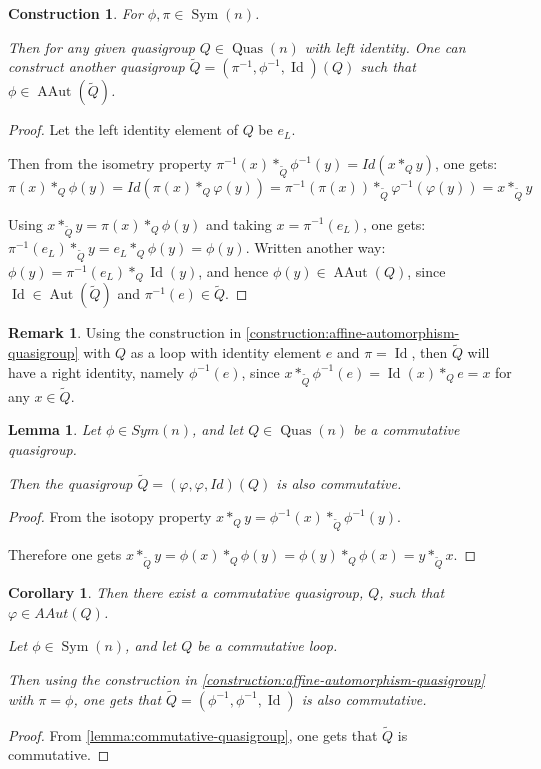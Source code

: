 \documentclass[a4paper, 12pt, english]{article}
\theoremstyle{plain}
\newtheorem{corollary}[theorem]{Corollary}
\newtheorem{lemma}[theorem]{Lemma}
\newtheorem{construction}[theorem]{Construction}
\theoremstyle{definition}
\newtheorem{remark}[theorem]{Remark}
\newcommand{\tuple}[1]{ \left( #1 \right) } %
\DeclareMathOperator{\Aut}{Aut}
\DeclareMathOperator{\AAut}{AAut}
\DeclareMathOperator{\Sym}{Sym}
\DeclareMathOperator{\Quas}{Quas}
\DeclareMathOperator{\Id}{Id}
\begin{document}
\begin{construction} \label{construction:affine-automorphism-quasigroup}
    For \( \phi, \pi \in \Sym(n) \).

    Then for any given quasigroup \( Q \in \Quas(n) \) with left identity. One can construct another quasigroup \( \tilde{Q} = (\pi^{-1}, \phi^{-1}, \Id)(Q) \) such that \( \phi \in \AAut(\tilde{Q}) \).
\end{construction}
\begin{proof}
    Let the left identity element of \( Q \) be \( e_L \).
    
    Then from the isometry property \( \pi^{-1}(x) *_{\tilde{Q}} \phi^{-1}(y) = Id(x *_Q y) \), one gets: 
    \[
        \pi(x) *_Q \phi(y) = Id(\pi(x) *_Q \varphi(y)) = \pi^{-1}(\pi(x)) *_{\tilde{Q}} \varphi^{-1}(\varphi(y)) = x *_{\tilde{Q}} y 
    \]

    Using \( x *_{\tilde{Q}} y = \pi(x) *_Q \phi(y) \) and taking \( x = \pi^{-1}(e_L) \), one gets: \( \pi^{-1}(e_L) *_{\tilde{Q}} y = e_L *_Q \phi(y) = \phi(y) \). Written another way: \( \phi(y) = \pi^{-1}(e_L) *_Q \Id(y) \), and hence \( \phi(y) \in \AAut(Q) \), since \( \Id \in \Aut(\tilde{Q}) \) and \( \pi^{-1}(e) \in \tilde{Q} \).
\end{proof}

\begin{remark}
    Using the construction in \autoref{construction:affine-automorphism-quasigroup} with \( Q \) as a loop with identity element \( e \) and \( \pi = \Id \), then \( \tilde{Q} \) will have a right identity, namely \( \phi^{-1}(e) \), since \( x *_{\tilde{Q}} \phi^{-1}(e) = \Id(x) *_Q e = x \) for any \( x \in \tilde{Q} \).
\end{remark}

\begin{lemma} \label{lemma:commutative-quasigroup}
    Let \( \phi \in Sym(n) \), and let \( Q \in \Quas(n) \) be a commutative quasigroup.

    Then the quasigroup \( \tilde{Q} = (\varphi, \varphi, Id)(Q) \) is also commutative.
\end{lemma}
\begin{proof}
    From the isotopy property \( x *_Q y = \phi^{-1}(x) *_{\tilde{Q}} \phi^{-1}(y) \).

    Therefore one gets \( x *_{\tilde{Q}} y = \phi(x) *_Q \phi(y) = \phi(y) *_Q \phi(x) = y *_{\tilde{Q}} x \). 
\end{proof}

\begin{corollary}
    Then there exist a commutative quasigroup, \( Q \), such that \( \varphi \in AAut(Q) \).

    Let \( \phi \in \Sym(n) \), and let \( Q \) be a commutative loop.

    Then using the construction in \autoref{construction:affine-automorphism-quasigroup} with \( \pi = \phi \), one gets that \( \tilde{Q} = \tuple{\phi^{-1}, \phi^{-1}, \Id} \) is also commutative.
\end{corollary}
\begin{proof}
    From \autoref{lemma:commutative-quasigroup}, one gets that \( \tilde{Q} \) is commutative.
\end{proof}
\end{document}
